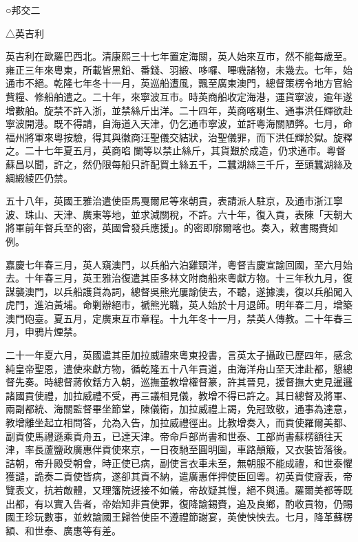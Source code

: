 
\begin{pinyinscope}
○邦交二

△英吉利

英吉利在歐羅巴西北。清康熙三十七年置定海關，英人始來互市，然不能每歲至。雍正三年來粵東，所載皆黑鉛、番錢、羽緞、哆囉、嗶嘰諸物，未幾去。七年，始通市不絕。乾隆七年冬十一月，英巡船遭風，飄至廣東澳門，總督策楞令地方官給貲糧、修船舶遣之。二十年，來寧波互市。時英商船收定海港，運貨寧波，逾年遂增數舶。旋禁不許入浙，並禁絲斤出洋。二十四年，英商喀喇生、通事洪任輝欲赴寧波開港。既不得請，自海道入天津，仍乞通市寧波，並訐粵海關陋弊。七月，命福州將軍來粵按驗，得其與徽商汪聖儀交結狀，治聖儀罪，而下洪任輝於獄。旋釋之。二十七年夏五月，英商啗闌等以禁止絲斤，其貨艱於成造，仍求通市。粵督蘇昌以聞，許之，然仍限每船只許配買土絲五千，二蠶湖絲三千斤，至頭蠶湖絲及綢緞綾匹仍禁。

五十八年，英國王雅治遣使臣馬戛爾尼等來朝貢，表請派人駐京，及通市浙江寧波、珠山、天津、廣東等地，並求減關稅，不許。六十年，復入貢，表陳「天朝大將軍前年督兵至的密，英國曾發兵應援」。的密即廓爾喀也。奏入，敕書賜賚如例。

嘉慶七年春三月，英人窺澳門，以兵船六泊雞頸洋，粵督吉慶宣諭回國，至六月始去。十年春三月，英王雅治復遣其臣多林文附商船來粵獻方物。十三年秋九月，復謀襲澳門，以兵船護貨為詞，總督吳熊光屢諭使去，不聽，遂據澳，復以兵船闖入虎門，進泊黃埔。命剿辦絕市，褫熊光職，英人始於十月退師。明年春二月，增築澳門砲臺。夏五月，定廣東互市章程。十九年冬十一月，禁英人傳教。二十年春三月，申鴉片煙禁。

二十一年夏六月，英國遣其臣加拉威禮來粵東投書，言英太子攝政已歷四年，感念純皇帝聖恩，遣使來獻方物，循乾隆五十八年貢道，由海洋舟山至天津赴都，懇總督先奏。時總督蔣攸銛方入朝，巡撫董教增權督篆，許其晉見，援督撫大吏見暹邏諸國貢使禮，加拉威禮不受，再三議相見儀，教增不得已許之。其日總督及將軍、兩副都統、海關監督畢坐節堂，陳儀衛，加拉威禮上謁，免冠致敬，通事為達意，教增離坐起立相問答，允為入告，加拉威禮徑出。比教增奏入，而貢使羅爾美都、副貢使馬禮遜乘貢舟五，已達天津。帝命戶部尚書和世泰、工部尚書蘇楞額往天津，率長蘆鹽政廣惠伴貢使來京，一日夜馳至圓明園，車路顛簸，又衣裝皆落後。詰朝，帝升殿受朝會，時正使已病，副使言衣車未至，無朝服不能成禮，和世泰懼獲譴，詭奏二貢使皆病，遂卻其貢不納，遣廣惠伴押使臣回粵。初英貢使齎表，帝覽表文，抗若敵體，又理籓院迓接不如儀，帝故疑其慢，絕不與通。羅爾美都等既出都，有以實入告者，帝始知非貢使罪，復降諭錫賚，追及良鄉，酌收貢物，仍賜國王珍玩數事，並敕諭國王歸咎使臣不遵禮節謝宴，英使怏怏去。七月，降革蘇楞額、和世泰、廣惠等有差。


\end{pinyinscope}
